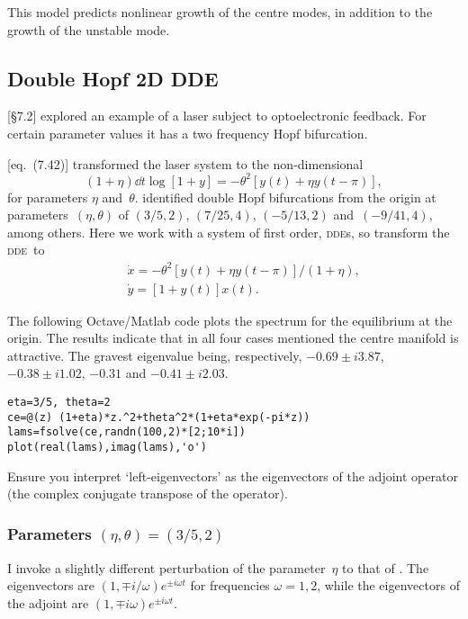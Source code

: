 \documentclass[11pt,a5paper]{article}
\def\dde{\textsc{dde}}
\begin{document}
This model predicts nonlinear growth of the centre modes, in addition to the growth of the unstable mode.


\subsection{Double Hopf 2D DDE}

\cite{Erneux2009} [\S7.2] explored an example of a laser subject to optoelectronic feedback.
For certain parameter values it has a two frequency Hopf bifurcation.

\cite{Erneux2009} [eq.~(7.42)] transformed the laser system to the non-dimensional
\begin{equation*}
(1+\eta)\dd t{\log[1+y]}=-\theta^2
\left[y(t)+\eta y(t-\pi)\right],
\end{equation*}
for parameters \(\eta\) and~\(\theta\).  
\cite{Erneux2009} identified double Hopf bifurcations from the origin at parameters~\((\eta,\theta)\) of \((3/5,2)\), \((7/25,4)\), \((-5/13,2)\) and~\((-9/41,4)\), among others.
Here we work with a system of first order, \dde{}s, so transform the  \dde\ to
\begin{eqnarray*}
&&\dot x=-\theta^2
\left[y(t)+\eta y(t-\pi)\right]/(1+\eta),
\\&& \dot y=[1+y(t)]x(t).
\end{eqnarray*}

The following Octave/Matlab code plots the spectrum for the equilibrium at the origin.  
The results indicate that in all four cases mentioned the centre manifold is attractive.
The gravest eigenvalue being, respectively, \(-0.69\pm i3.87\), \(-0.38\pm i1.02\), \(-0.31\) and \(-0.41\pm i2.03\).
\begin{verbatim}
eta=3/5, theta=2
ce=@(z) (1+eta)*z.^2+theta^2*(1+eta*exp(-pi*z))
lams=fsolve(ce,randn(100,2)*[2;10*i])
plot(real(lams),imag(lams),'o')
\end{verbatim}



Ensure you interpret `left-eigenvectors' as the eigenvectors of the adjoint operator (the complex conjugate transpose of the operator).

\subsubsection{Parameters $(\eta,\theta)=(3/5,2)$}
I invoke a slightly different perturbation of the parameter~\(\eta\) to that of \cite{Erneux2009}.
The eigenvectors are \((1,\mp i/\omega)e^{\pm i\omega t}\) for frequencies \(\omega=1,2\), while the eigenvectors of the adjoint are \((1,\mp i\omega)e^{\pm i\omega t}\). 
\end{document}
